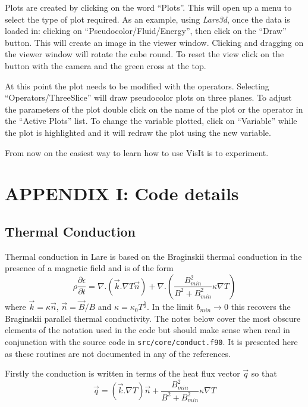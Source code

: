 \documentclass[11pt]{article}
\begin{document}
Plots are created by clicking on the word ``Plots''. This will open up a menu to select the type of plot required. As an example, using {\it Lare3d}, once the data is loaded in: clicking on ``Pseudocolor/Fluid/Energy'', then click on the ``Draw'' button. This will create an image in the viewer window. Clicking and dragging on the viewer window will rotate the cube round. To reset the view click on the button  with the camera and the green cross at the top. 

At this point the plot needs to be modified with the operators. Selecting ``Operators/ThreeSlice'' will draw pseudocolor plots on three planes. To adjust the parameters of the plot double click on the name of the plot or the operator in the ``Active Plots'' list. To change the variable plotted, click on ``Variable'' while the plot is highlighted and it will redraw the plot using the new variable.

From now on the easiest way to learn how to use VisIt is to experiment.

\newpage
\section*{ APPENDIX I: Code details}
\subsection*{Thermal Conduction} %
\label{sec:thermal_code}  

Thermal conduction in Lare is based on the Braginskii thermal conduction in the presence of a magnetic field and is of the form\\
\[
\rho \frac{\partial \epsilon}{\partial t} = \nabla . \left(\vec{k} . \nabla T \vec{n} \right) +  \nabla . \left(  \frac{B_{min}^2}{B^2+B_{min}^2} \kappa \nabla T \right)
\]
where $\vec{k} = \kappa \vec{n}$, $\vec{n} = \vec{B}/B$ and $\kappa = \kappa_0  T^\frac{5}{2}$. In the limit $b_{min}\to 0$ this recovers the Braginskii parallel thermal conductivity. The notes below cover the most obscure elements of the notation used in the code but should make sense when read in conjunction with the source code in {\tt src/core/conduct.f90}. It is presented here as these routines are not documented in any of the references. 

Firstly the conduction is written in terms of the heat flux vector $\vec{q}$ so that
\[
\vec{q}= \left(\vec{k} . \nabla T \right) \vec{n} +    \frac{B_{min}^2}{B^2+B_{min}^2} \kappa \nabla T
\]
\end{document}
